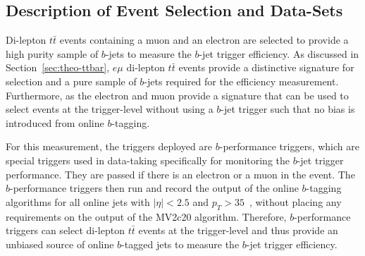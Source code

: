 \subsection{Description of Event Selection and Data-Sets}
\label{sec:trig-evtSel}

Di-lepton $t\bar{t}$ events containing a muon and an electron are selected to provide a high purity sample of $b$-jets to measure the $b$-jet trigger efficiency.
As discussed in Section~\ref{sec:theo-ttbar}, 
$e\mu$ di-lepton $t\bar{t}$ events provide a distinctive signature for selection and a pure sample of $b$-jets required for the efficiency measurement.
Furthermore, as the electron and muon provide a signature that can be used to select events at the trigger-level without using a $b$-jet trigger
such that no bias is introduced from online $b$-tagging.

For this measurement, the triggers deployed are $b$-performance triggers,
which are special triggers used in data-taking specifically for monitoring the $b$-jet trigger performance.
They are passed if there is an electron or a muon in the event.
The $b$-performance triggers then run and record the output of the online $b$-tagging algorithms for all online jets with $|\eta|<2.5$ and
\mbox{$p_{T}>35$~\GeV}, without placing any requirements on the output of the MV2c20 algorithm.
Therefore, $b$-performance triggers can select  di-lepton $t\bar{t}$ events at the trigger-level
and thus provide an unbiased source of online $b$-tagged jets to measure the $b$-jet trigger efficiency.

